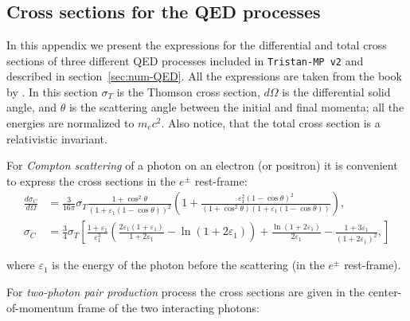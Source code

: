 \chapter{}
\section{Cross sections for the QED processes}
\label{appendix:num-crosssections}

In this appendix we present the expressions for the differential and total cross sections of three different QED processes included in \texttt{Tristan-MP v2} and described in section~\ref{sec:num-QED}. All the expressions are taken from the book by \cite{1985quel.book.....A}. In this section $\sigma_T$ is the Thomson cross section, $d\Omega$ is the differential solid angle, and $\theta$ is the scattering angle between the initial and final momenta; all the energies are normalized to $m_e c^2$. Also notice, that the total cross section is a relativistic invariant.

For \emph{Compton scattering} of a photon on an electron (or positron) it is convenient to express the cross sections in the $e^\pm$ rest-frame:
\begin{equation}
    \begin{aligned}
        \frac{d \sigma_C}{d\Omega} &= \frac{3}{16\pi} \sigma_T 
            \frac{1 + \cos^2{\theta}}{\left(1 + \varepsilon_1(1-\cos{\theta})\right)^2}
            \left(1 + \frac{\varepsilon_1^2(1-\cos{\theta})^2}{(1+\cos^2{\theta})\left(1 + \varepsilon_1 (1-\cos{\theta})\right)}\right),\\
        \sigma_C &= \frac{3}{4}\sigma_T\left[
            \frac{1+\varepsilon_1}{\varepsilon_1^3}
                \left( \frac{2\varepsilon_1(1+\varepsilon_1)}{1+2\varepsilon_1} - \ln{(1 + 2\varepsilon_1)}\right)
            + \frac{\ln{(1+2\varepsilon_1)}}{2\varepsilon_1} - \frac{1 + 3\varepsilon_1}{(1 + 2\varepsilon_1)^2},
        \right]
    \end{aligned}
\end{equation}

\noindent where $\varepsilon_1$ is the energy of the photon before the scattering (in the  $e^\pm$ rest-frame).

For \emph{two-photon pair production} process the cross sections are given in the center-of-momentum frame of the two interacting photons:

